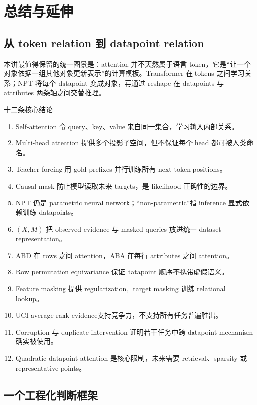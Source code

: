 \section{总结与延伸}

\subsection{从 token relation 到 datapoint relation}

本讲最值得保留的统一图景是：attention 并不天然属于语言 token，它是“让一个对象依据一组其他对象更新表示”的计算模板。Transformer 在 tokens 之间学习关系；NPT 将每个 datapoint 变成对象，再通过 reshape 在 datapoints 与 attributes 两条轴之间交替推理。

\begin{importantbox}{十二条核心结论}
\begin{enumerate}
  \item Self-attention 令 query、key、value 来自同一集合，学习输入内部关系。
  \item Multi-head attention 提供多个投影子空间，但不保证每个 head 都可被人类命名。
  \item Teacher forcing 用 gold prefixes 并行训练所有 next-token positions。
  \item Causal mask 防止模型读取未来 targets，是 likelihood 正确性的边界。
  \item NPT 仍是 parametric neural network；“non-parametric”指 inference 显式依赖训练 datapoints。
  \item $(X,M)$ 把 observed evidence 与 masked queries 放进统一 dataset representation。
  \item ABD 在 rows 之间 attention，ABA 在每行 attributes 之间 attention。
  \item Row permutation equivariance 保证 datapoint 顺序不携带虚假语义。
  \item Feature masking 提供 regularization，target masking 训练 relational lookup。
  \item UCI average-rank evidence支持竞争力，不支持所有任务普遍胜出。
  \item Corruption 与 duplicate intervention 证明若干任务中跨 datapoint mechanism 确实被使用。
  \item Quadratic datapoint attention 是核心限制，未来需要 retrieval、sparsity 或 representative points。
\end{enumerate}
\end{importantbox}

\subsection{一个工程化判断框架}

